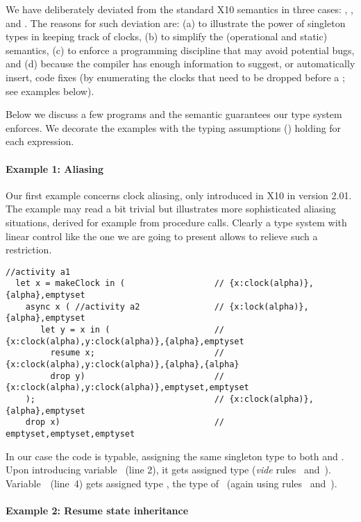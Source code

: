 We have deliberately deviated from the standard X10 semantics in three
cases: , , and . The reasons for such
deviation are: (a) to illustrate the power of singleton types in
keeping track of clocks, (b) to simplify the (operational and static)
semantics, (c) to enforce a programming discipline that may avoid
potential bugs, and (d) because the compiler has enough information to
suggest, or automatically insert, code fixes (\eg by enumerating the
clocks that need to be dropped before a \nextk; see examples below).

Below we discuss a few \xtenclocks programs and the semantic
guarantees our type system enforces.
We decorate the examples with the typing assumptions () holding for each expression.

\paragraph{Example 1: Aliasing}

Our first example concerns clock aliasing, only introduced in X10 in
version 2.01. The example may read a bit trivial but illustrates more
sophisticated aliasing situations, derived for example from procedure
calls. 
Clearly a type system with linear control like the one we are going to
present allows to relieve such a restriction.
\begin{lstlisting}[numbers=right]
  //activity a1
  let x = makeClock in (                  // {x:clock(alpha)},{alpha},emptyset
    async x ( //activity a2               // {x:lock(alpha)},{alpha},emptyset
       let y = x in (                     // {x:clock(alpha),y:clock(alpha)},{alpha},emptyset
         resume x;                        // {x:clock(alpha),y:clock(alpha)},{alpha},{alpha} 
         drop y)                          // {x:clock(alpha),y:clock(alpha)},emptyset,emptyset
    );                                    // {x:clock(alpha)},{alpha},emptyset 
    drop x)                               // emptyset,emptyset,emptyset
\end{lstlisting}
In our case the code is typable, assigning the same singleton type
 to both  and . Upon introducing variable
~(line 2), it gets assigned type  (\textit{vide}
rules~\Tlet{} and~\Tmake). Variable~~(line~4) gets assigned type
, the type of ~(again using rules~\Tlet{} and~\Tmake).

\paragraph{Example 2: Resume state inheritance}

